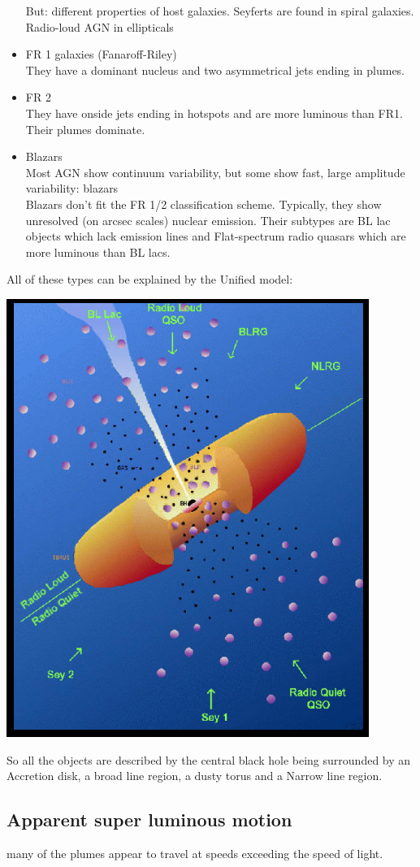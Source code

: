 \documentclass[11pt,a4paper]{article}
\begin{document}
\begin{itemize}
But: different properties of host galaxies.
Seyferts are found in spiral galaxies. Radio-loud
AGN in ellipticals 
\item FR 1 galaxies (Fanaroff-Riley) \\
    They have a dominant nucleus and two asymmetrical jets ending in plumes.
\item FR 2 \\ 
    They have onside jets ending in hotspots and are more luminous than FR1. 
    Their plumes dominate.
\item Blazars \\
    Most AGN show continuum variability, but
some show fast, large amplitude variability:
blazars \\
Blazars don’t fit the FR 1/2 classification scheme. Typically, they show unresolved (on arcsec scales) nuclear
emission.
Their subtypes are BL lac objects which lack emission lines and Flat-spectrum radio quasars which are more luminous than BL lacs.
\end{itemize}
All of these types can be explained by the Unified model: 

\begin{center}
    \includegraphics[width=0.6\linewidth]{screenshot_2024-01-26-154109.png}
\end{center}
So all the objects are described by the central black hole being surrounded by an Accretion disk, a broad line region, a dusty torus and a Narrow line region.

\subsection{Apparent super luminous motion}
many of the plumes appear to travel at speeds exceeding the speed of light.
\end{document}
